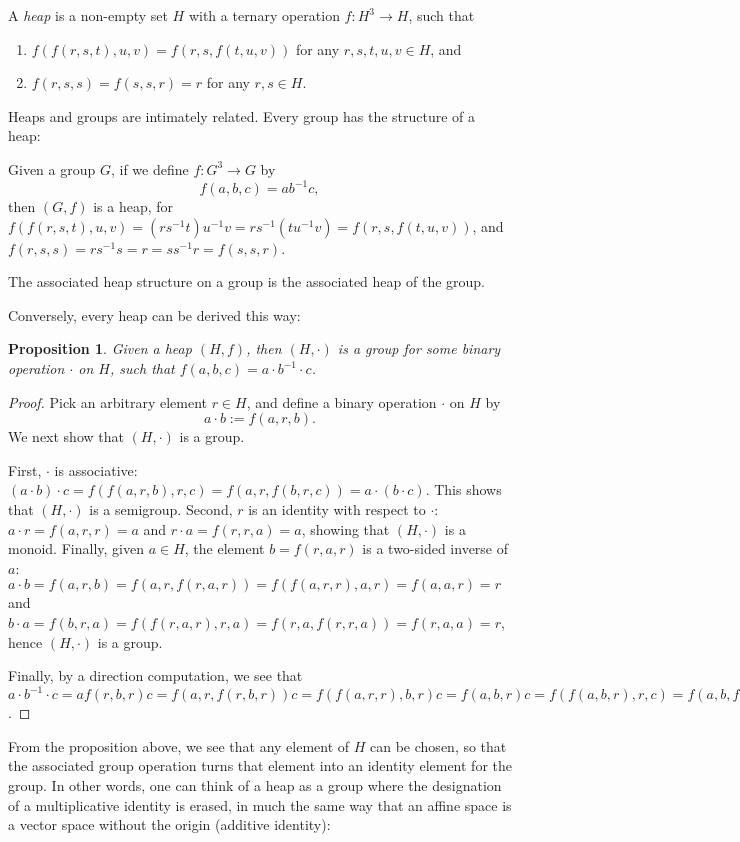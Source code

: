 \documentclass[12pt]{article}
\newtheorem{prop}{Proposition}
\begin{document}
A \emph{heap} is a non-empty set $H$ with a ternary operation $f:H^3\to H$, such that
\begin{enumerate}
\item $f(f(r,s,t),u,v)=f(r,s,f(t,u,v))$ for any $r,s,t,u,v\in H$, and
\item $f(r,s,s)=f(s,s,r)=r$ for any $r,s\in H$.
\end{enumerate}

Heaps and groups are intimately related.  Every group has the structure of a heap:

Given a group $G$, if we define $f:G^3\to G$ by $$f(a,b,c)=ab^{-1}c,$$ then $(G,f)$ is a heap, for $f(f(r,s,t),u,v)=(rs^{-1}t)u^{-1}v=rs^{-1}(tu^{-1}v)= f(r,s,f(t,u,v))$, and $f(r,s,s)=rs^{-1}s=r=ss^{-1}r=f(s,s,r)$.

The associated heap structure on a group is the associated heap of the group.

Conversely, every heap can be derived this way:

\begin{prop}  Given a heap $(H,f)$, then $(H,\cdot)$ is a group for some binary operation $\cdot$ on $H$, such that $f(a,b,c) = a\cdot b^{-1} \cdot c$.
\end{prop}
\begin{proof}
Pick an arbitrary element $r\in H$, and define a binary operation $\cdot$ on $H$ by $$a\cdot b := f(a,r,b).$$  We next show that $(H,\cdot)$ is a group.

First, $\cdot$ is associative: $(a\cdot b)\cdot c = f(f(a,r,b),r,c) = f(a,r,f(b,r,c))= a \cdot (b\cdot c)$.  This shows that $(H,\cdot)$ is a semigroup.  Second, $r$ is an identity with respect to $\cdot$: $a\cdot r = f(a,r,r) = a$ and $r\cdot a = f(r,r,a)=a$, showing that $(H,\cdot)$ is a monoid.  Finally, given $a\in H$, the element $b=f(r,a,r)$ is a two-sided inverse of $a$: $a\cdot b = f(a,r,b)=f(a,r,f(r,a,r))=f(f(a,r,r),a,r)=f(a,a,r)=r$ and $b\cdot a=f(b,r,a)= f(f(r,a,r),r,a) = f(r,a,f(r,r,a)) = f(r,a,a)=r$, hence $(H,\cdot)$ is a group.

Finally, by a direction computation, we see that $a\cdot b^{-1} \cdot c= a f(r,b,r) c = f(a,r,f(r,b,r))c = f(f(a,r,r),b,r)c = f(a,b,r)c = f(f(a,b,r),r,c)= f(a,b,f(r,r,c))=f(a,b,c)$.
\end{proof}

From the proposition above, we see that any element of $H$ can be chosen, so that the associated group operation turns that element into an identity element for the group.  In other words, one can think of a heap as a group where the designation of a multiplicative identity is erased, in much the same way that an affine space is a vector space without the origin (additive identity):
\end{document}
